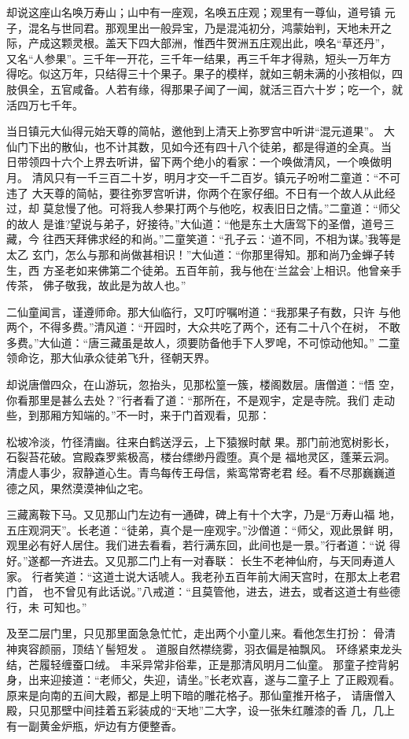 却说这座山名唤万寿山；山中有一座观，名唤五庄观；观里有一尊仙，道号镇
元子，混名与世同君。那观里出一般异宝，乃是混沌初分，鸿蒙始判，天地未开之
际，产成这颗灵根。盖天下四大部洲，惟西牛贺洲五庄观出此，唤名“草还丹”，
又名“人参果”。三千年一开花，三千年一结果，再三千年才得熟，短头一万年方
得吃。似这万年，只结得三十个果子。果子的模样，就如三朝未满的小孩相似，四
肢俱全，五官咸备。人若有缘，得那果子闻了一闻，就活三百六十岁；吃一个，就
活四万七千年。

当日镇元大仙得元始天尊的简帖，邀他到上清天上弥罗宫中听讲“混元道果”。
大仙门下出的散仙，也不计其数，见如今还有四十八个徒弟，都是得道的全真。当
日带领四十六个上界去听讲，留下两个绝小的看家：一个唤做清风，一个唤做明月。
清风只有一千三百二十岁，明月才交一千二百岁。镇元子吩咐二童道：“不可违了
大天尊的简帖，要往弥罗宫听讲，你两个在家仔细。不日有一个故人从此经过，却
莫怠慢了他。可将我人参果打两个与他吃，权表旧日之情。”二童道：“师父的故人
是谁?望说与弟子，好接待。”大仙道：“他是东土大唐驾下的圣僧，道号三藏，今
往西天拜佛求经的和尚。”二童笑道：“孔子云：‘道不同，不相为谋。’我等是太乙
玄门，怎么与那和尚做甚相识！”大仙道：“你那里得知。那和尚乃金蝉子转生，西
方圣老如来佛第二个徒弟。五百年前，我与他在‘兰盆会’上相识。他曾亲手传茶，
佛子敬我，故此是为故人也。”

二仙童闻言，谨遵师命。那大仙临行，又叮咛嘱咐道：“我那果子有数，只许
与他两个，不得多费。”清风道：“开园时，大众共吃了两个，还有二十八个在树，
不敢多费。”大仙道：“唐三藏虽是故人，须要防备他手下人罗唣，不可惊动他知。”
二童领命讫，那大仙承众徒弟飞升，径朝天界。

却说唐僧四众，在山游玩，忽抬头，见那松篁一簇，楼阁数层。唐僧道：“悟
空，你看那里是甚么去处？”行者看了道：“那所在，不是观宇，定是寺院。我们
走动些，到那厢方知端的。”不一时，来于门首观看，见那：

松坡冷淡，竹径清幽。往来白鹤送浮云，上下猿猴时献
果。那门前池宽树影长，石裂苔花破。宫殿森罗紫极高，楼台缥缈丹霞堕。真个是
福地灵区，蓬莱云洞。清虚人事少，寂静道心生。青鸟每传王母信，紫鸾常寄老君
经。看不尽那巍巍道德之风，果然漠漠神仙之宅。

三藏离鞍下马。又见那山门左边有一通碑，碑上有十个大字，乃是“万寿山福
地，五庄观洞天”。长老道：“徒弟，真个是一座观宇。”沙僧道：“师父，观此景鲜
明，观里必有好人居住。我们进去看看，若行满东回，此间也是一景。”行者道：“说
得好。”遂都一齐进去。又见那二门上有一对春联：
长生不老神仙府，与天同寿道人家。
行者笑道：“这道士说大话唬人。我老孙五百年前大闹天宫时，在那太上老君门首，
也不曾见有此话说。”八戒道：“且莫管他，进去，进去，或者这道士有些德行，未
可知也。”

及至二层门里，只见那里面急急忙忙，走出两个小童儿来。看他怎生打扮：
骨清神爽容颜丽，顶结丫髻短发。
道服自然襟绕雾，羽衣偏是袖飘风。
环绦紧束龙头结，芒履轻缠蚕口绒。
丰采异常非俗辈，正是那清风明月二仙童。
那童子控背躬身，出来迎接道：“老师父，失迎，请坐。”长老欢喜，遂与二童子上
了正殿观看。原来是向南的五间大殿，都是上明下暗的雕花格子。那仙童推开格子，
请唐僧入殿，只见那壁中间挂着五彩装成的“天地”二大字，设一张朱红雕漆的香
几，几上有一副黄金炉瓶，炉边有方便整香。

